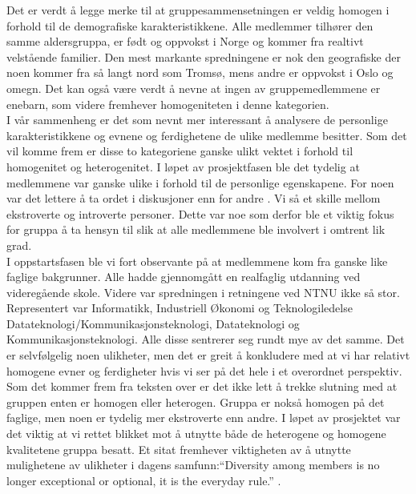 Det er verdt å legge merke til at gruppesammensetningen er veldig homogen i forhold til de demografiske karakteristikkene. Alle medlemmer tilhører den samme aldersgruppa, er født og oppvokst i Norge og kommer fra realtivt velstående familier. Den mest markante spredningene er nok den geografiske der noen kommer fra så langt nord som Tromsø, mens andre er oppvokst i Oslo og omegn. Det kan også være verdt å nevne at ingen av gruppemedlemmene er enebarn, som videre fremhever homogeniteten i denne kategorien.\\

I vår sammenheng er det som nevnt mer interessant å analysere de personlige karakteristikkene og evnene og ferdighetene de ulike medlemme besitter. Som det vil komme frem er disse to kategoriene ganske ulikt vektet i forhold til homogenitet og heterogenitet. I løpet av prosjektfasen ble det tydelig at medlemmene var ganske ulike i forhold til de personlige egenskapene. For noen var det lettere å ta ordet i diskusjoner enn for andre . Vi så et skille mellom ekstroverte og introverte personer. Dette var noe som derfor ble et viktig fokus for gruppa å ta hensyn til slik at alle medlemmene ble involvert i omtrent lik grad.\\

I oppstartsfasen ble vi fort observante på at medlemmene kom fra ganske like faglige bakgrunner. Alle hadde gjennomgått en realfaglig utdanning ved videregående skole. Videre var spredningen i retningene ved NTNU ikke så stor. Representert var Informatikk, Industriell Økonomi og Teknologiledelse Datateknologi/Kommunikasjonsteknologi, Datateknologi og Kommunikasjonsteknologi. Alle disse sentrerer seg rundt mye av det samme. Det er selvfølgelig noen ulikheter, men det er greit å konkludere med at vi har relativt homogene evner og ferdigheter hvis vi ser på det hele i et overordnet perspektiv.\\

Som det kommer frem fra teksten over er det ikke lett å trekke slutning med at gruppen enten er homogen eller heterogen. Gruppa er nokså homogen på det faglige, men noen er tydelig mer ekstroverte enn andre. I løpet av prosjektet var det viktig at vi rettet blikket mot å utnytte både de heterogene og homogene kvalitetene gruppa besatt. Et sitat fremhever viktigheten av å utnytte mulighetene av ulikheter i dagens samfunn:``Diversity among members is no longer exceptional or optional, it is the everyday rule.'' \citep{gruppeteori}.\\

